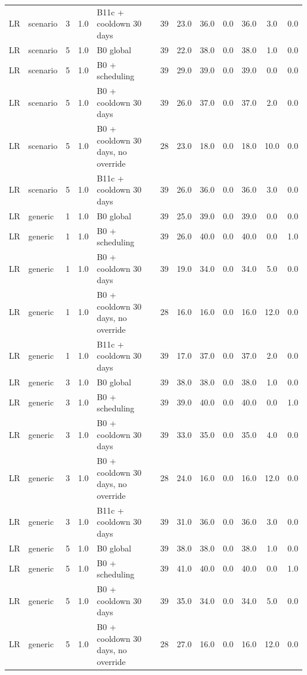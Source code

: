 \begin{longtable}{lllllccccccc}
LR & scenario & 3 & 1.0 & B11c + cooldown 30 days & 39 & 23.0 & 36.0 & 0.0 & 36.0 & 3.0 & 0.0 \\
LR & scenario & 5 & 1.0 & B0 global & 39 & 22.0 & 38.0 & 0.0 & 38.0 & 1.0 & 0.0 \\
LR & scenario & 5 & 1.0 & B0 + scheduling & 39 & 29.0 & 39.0 & 0.0 & 39.0 & 0.0 & 0.0 \\
LR & scenario & 5 & 1.0 & B0 + cooldown 30 days & 39 & 26.0 & 37.0 & 0.0 & 37.0 & 2.0 & 0.0 \\
LR & scenario & 5 & 1.0 & B0 + cooldown 30 days, no override & 28 & 23.0 & 18.0 & 0.0 & 18.0 & 10.0 & 0.0 \\
LR & scenario & 5 & 1.0 & B11c + cooldown 30 days & 39 & 26.0 & 36.0 & 0.0 & 36.0 & 3.0 & 0.0 \\
LR & generic & 1 & 1.0 & B0 global & 39 & 25.0 & 39.0 & 0.0 & 39.0 & 0.0 & 0.0 \\
LR & generic & 1 & 1.0 & B0 + scheduling & 39 & 26.0 & 40.0 & 0.0 & 40.0 & 0.0 & 1.0 \\
LR & generic & 1 & 1.0 & B0 + cooldown 30 days & 39 & 19.0 & 34.0 & 0.0 & 34.0 & 5.0 & 0.0 \\
LR & generic & 1 & 1.0 & B0 + cooldown 30 days, no override & 28 & 16.0 & 16.0 & 0.0 & 16.0 & 12.0 & 0.0 \\
LR & generic & 1 & 1.0 & B11c + cooldown 30 days & 39 & 17.0 & 37.0 & 0.0 & 37.0 & 2.0 & 0.0 \\
LR & generic & 3 & 1.0 & B0 global & 39 & 38.0 & 38.0 & 0.0 & 38.0 & 1.0 & 0.0 \\
LR & generic & 3 & 1.0 & B0 + scheduling & 39 & 39.0 & 40.0 & 0.0 & 40.0 & 0.0 & 1.0 \\
LR & generic & 3 & 1.0 & B0 + cooldown 30 days & 39 & 33.0 & 35.0 & 0.0 & 35.0 & 4.0 & 0.0 \\
LR & generic & 3 & 1.0 & B0 + cooldown 30 days, no override & 28 & 24.0 & 16.0 & 0.0 & 16.0 & 12.0 & 0.0 \\
LR & generic & 3 & 1.0 & B11c + cooldown 30 days & 39 & 31.0 & 36.0 & 0.0 & 36.0 & 3.0 & 0.0 \\
LR & generic & 5 & 1.0 & B0 global & 39 & 38.0 & 38.0 & 0.0 & 38.0 & 1.0 & 0.0 \\
LR & generic & 5 & 1.0 & B0 + scheduling & 39 & 41.0 & 40.0 & 0.0 & 40.0 & 0.0 & 1.0 \\
LR & generic & 5 & 1.0 & B0 + cooldown 30 days & 39 & 35.0 & 34.0 & 0.0 & 34.0 & 5.0 & 0.0 \\
LR & generic & 5 & 1.0 & B0 + cooldown 30 days, no override & 28 & 27.0 & 16.0 & 0.0 & 16.0 & 12.0 & 0.0 \\

\end{longtable}
